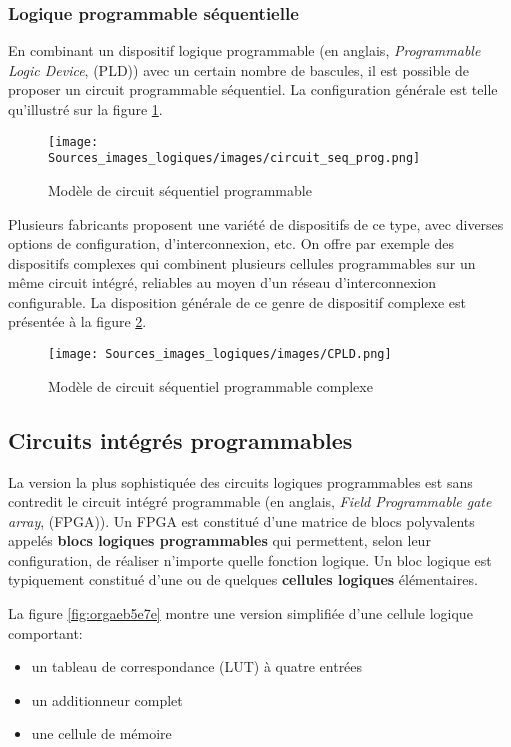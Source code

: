 \documentclass[11pt]{article}
\begin{document}
\subsubsection{Logique programmable séquentielle}
\label{sec:org0f71075}

En combinant un dispositif logique programmable (en anglais,
\emph{Programmable Logic Device}, (PLD)) avec un certain nombre de
bascules, il est possible de proposer un circuit programmable
séquentiel. La configuration générale est telle qu'illustré sur la
figure \ref{fig:org79fe2c1}.


\begin{figure}[htbp]
\centering
\texttt{[image: Sources\_images\_logiques/images/circuit\_seq\_prog.png]}
\caption{\label{fig:org79fe2c1}Modèle de circuit séquentiel programmable}
\end{figure} 

Plusieurs fabricants proposent une variété de dispositifs de ce type,
avec diverses options de configuration, d'interconnexion, etc.  On
offre par exemple des dispositifs complexes qui combinent plusieurs
cellules programmables sur un même circuit intégré, reliables au moyen
d'un réseau d'interconnexion configurable. La disposition générale de
ce genre de dispositif complexe est présentée à la figure \ref{fig:org749db41}.

\begin{figure}[htbp]
\centering
\texttt{[image: Sources\_images\_logiques/images/CPLD.png]}
\caption{\label{fig:org749db41}Modèle de circuit séquentiel programmable complexe}
\end{figure}

\subsection{Circuits intégrés programmables}
\label{sec:orgfe929b4}

La version la plus sophistiquée des circuits logiques programmables
est sans contredit le circuit intégré programmable (en anglais, \emph{Field
Programmable gate array}, (FPGA)). Un FPGA est constitué d'une matrice
de blocs polyvalents appelés \textbf{blocs logiques programmables} qui
permettent, selon leur configuration, de réaliser n'importe quelle
fonction logique. Un bloc logique est typiquement constitué d'une ou
de quelques \textbf{cellules logiques} élémentaires.

La figure \ref{fig:orgaeb5e7e} montre une version simplifiée d'une cellule
logique comportant:
\begin{itemize}
\item un tableau de correspondance (LUT) à quatre entrées
\item un additionneur complet
\item une cellule de mémoire
\end{itemize}
\end{document}

